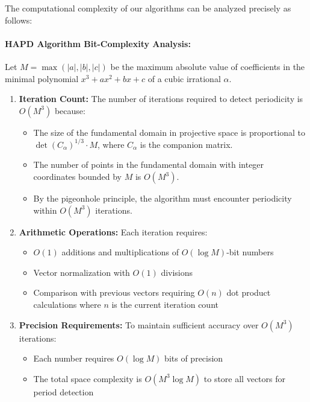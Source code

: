 \begin{response}
The computational complexity of our algorithms can be analyzed precisely as follows:

\paragraph{HAPD Algorithm Bit-Complexity Analysis:}

Let $M = \max(|a|, |b|, |c|)$ be the maximum absolute value of coefficients in the minimal polynomial $x^3 + ax^2 + bx + c$ of a cubic irrational $\alpha$. 

\begin{enumerate}
\item \textbf{Iteration Count:} The number of iterations required to detect periodicity is $O(M^3)$ because:
   \begin{itemize}
   \item The size of the fundamental domain in projective space is proportional to $\det(C_\alpha)^{1/3} \cdot M$, where $C_\alpha$ is the companion matrix.
   \item The number of points in the fundamental domain with integer coordinates bounded by $M$ is $O(M^3)$.
   \item By the pigeonhole principle, the algorithm must encounter periodicity within $O(M^3)$ iterations.
   \end{itemize}

\item \textbf{Arithmetic Operations:} Each iteration requires:
   \begin{itemize}
   \item $O(1)$ additions and multiplications of $O(\log M)$-bit numbers
   \item Vector normalization with $O(1)$ divisions
   \item Comparison with previous vectors requiring $O(n)$ dot product calculations where $n$ is the current iteration count
   \end{itemize}

\item \textbf{Precision Requirements:} To maintain sufficient accuracy over $O(M^3)$ iterations:
   \begin{itemize}
   \item Each number requires $O(\log M)$ bits of precision
   \item The total space complexity is $O(M^3 \log M)$ to store all vectors for period detection
   \end{itemize}


\end{enumerate}
\end{response}
